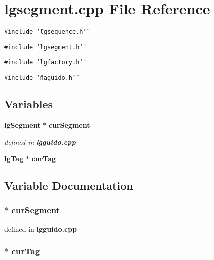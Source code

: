 \section{lgsegment.cpp File Reference}
\label{lgsegment_8cpp}
{\tt \#include \char`\"{}lgsequence.h\char`\"{}}\par
{\tt \#include \char`\"{}lgsegment.h\char`\"{}}\par
{\tt \#include \char`\"{}lgfactory.h\char`\"{}}\par
{\tt \#include \char`\"{}naguido.h\char`\"{}}\par
\subsection*{Variables}
\begin{CompactItemize}
\item 
{\bf lg\-Segment} $\ast$ {\bf cur\-Segment}
\begin{CompactList}\small\item\em defined in {\bf lgguido.cpp} \item\end{CompactList}\item 
{\bf lg\-Tag} $\ast$ {\bf cur\-Tag}
\end{CompactItemize}


\subsection{Variable Documentation}
\subsubsection{$\ast$ {\bf cur\-Segment}}\label{lgsegment_8cpp_a0}


defined in {\bf lgguido.cpp} 

\subsubsection{$\ast$ {\bf cur\-Tag}}\label{lgsegment_8cpp_a1}


